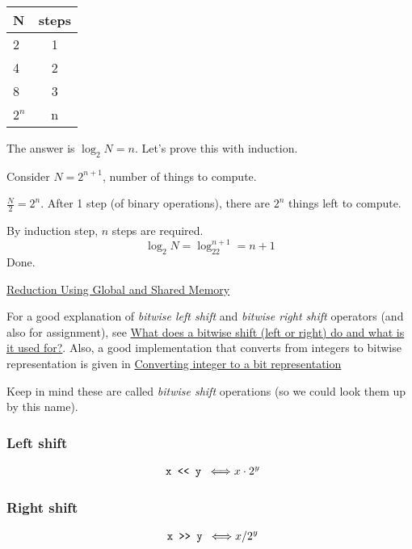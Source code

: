 \documentclass[10pt]{amsart}
\begin{document}
\begin{multicols*}{2}
\begin{tabular}{ l | c }
  N & steps \\ \hline
  2 & 1 \\
  4 & 2 \\
  8 & 3 \\
  $2^n$ & n
  \end{tabular}

The answer is $\log_2N =n$.  Let's prove this with induction.

Consider $N=2^{n+1}$, number of things to compute.

$\frac{N}{2} = 2^n$.  After 1 step (of binary operations), there are $2^n$ things left to compute.

By induction step, $n$ steps are required.
\[
\log_2N = \log_22^{n+1} = n+1
\]
Done.

\href{https://classroom.udacity.com/courses/cs344/lessons/86719951/concepts/877097880923#}{Reduction Using Global and Shared Memory}

For a good explanation of \emph{bitwise left shift} and \emph{bitwise right shift} operators (and also for assignment), see \href{http://stackoverflow.com/questions/6385792/what-does-a-bitwise-shift-left-or-right-do-and-what-is-it-used-for}{What does a bitwise shift (left or right) do and what is it used for?}.  Also, a good implementation that converts from integers to bitwise representation is given in \href{http://stackoverflow.com/questions/2686542/converting-integer-to-a-bit-representation}{Converting integer to a bit representation}

Keep in mind these are called \emph{bitwise shift} operations (so we could look them up by this name).

\subsubsection*{Left shift}

\[
\begin{gathered}
  \verb| x << y | \Longleftrightarrow x \cdot 2^y 
  \end{gathered}
\]

\subsubsection*{Right shift}

\[
\begin{gathered}
  \verb| x >> y | \Longleftrightarrow x / 2^y 
  \end{gathered}
\]


\end{multicols*}
\end{document}
